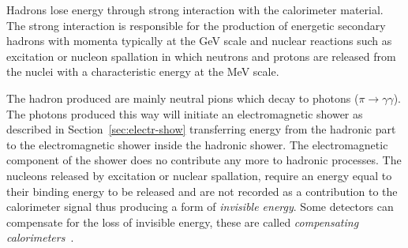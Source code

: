 Hadrons lose energy through strong interaction with the calorimeter
material. The strong interaction is responsible for the production of energetic
secondary hadrons with momenta typically at the GeV scale and nuclear reactions
such as excitation or nucleon spallation in which neutrons and protons are
released from the nuclei with a characteristic energy at the MeV scale.

The hadron produced are mainly neutral pions which decay to photons
($\pi \rightarrow \gamma \gamma$). The photons produced this way will initiate
an electromagnetic shower as described in Section~\ref{sec:electr-show}
transferring energy from the hadronic part to the electromagnetic shower inside
the hadronic shower. The electromagnetic component of the shower does no
contribute any more to hadronic processes. The nucleons released by excitation
or nuclear spallation, require an energy equal to their binding energy to be
released and are not recorded as a contribution to the calorimeter signal thus
producing a form of \emph{invisible energy}. Some detectors can compensate for
the loss of invisible energy, these are called \emph{compensating
  calorimeters}~\cite{Calorimetry}.
